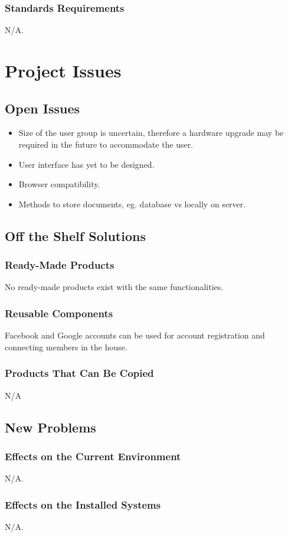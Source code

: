 \documentclass[12pt]{article}
\begin{document}
{\subsubsection{Standards Requirements}
N/A.

\section{Project Issues}
\subsection{Open Issues}
\begin{itemize}
  \item Size of the user group is uncertain, therefore a hardware upgrade may be 
required in the future to accommodate the user.
  \item User interface has yet to be designed.
  \item Browser compatibility.
  \item Methods to store documents, eg. database vs locally on server.
\end{itemize}

\subsection{Off the Shelf Solutions}
\subsubsection{Ready-Made Products}
No ready-made products exist with the same functionalities. 
\subsubsection{Reusable Components}
Facebook and Google accounts can be used for account registration and connecting members in 
the house.
\subsubsection{Products That Can Be Copied}
N/A
\subsection{New Problems}
\subsubsection{Effects on the Current Environment}
N/A.
\subsubsection{Effects on the Installed Systems}
N/A.
}
\end{document}
